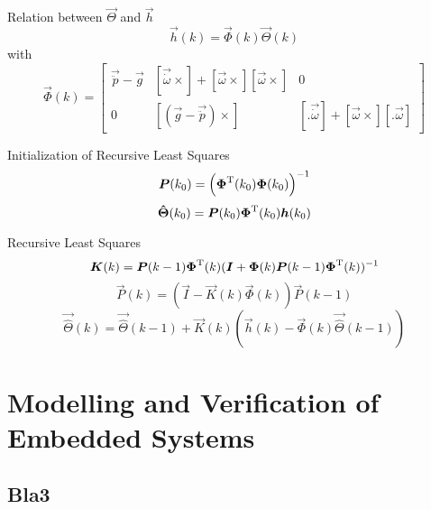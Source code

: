 Relation between $\vec{\Theta}$ and $\vec{h}$
\begin{equation}
	\vec{h}(k) = \vec{\Phi}(k) \vec{\Theta}(k)
\end{equation}
with
\begin{equation}
	\vec{\Phi}(k) = 
	\begin{bmatrix}
		\vec{\ddot p} - \vec{g}	& [\vec{\dot \omega} \times] + [\vec{\omega}\times] [\vec{\omega} \times]	& 0 \\
		0			& [(\vec{g} - \vec{\ddot p}) \times]									& [.  \vec{\dot \omega}] + [\vec{\omega} \times] [. \vec{\omega}]
	\end{bmatrix}
\end{equation}

Initialization of Recursive Least Squares
\begin{equation}
	\boldsymbol{P}(k_0) = \left( \boldsymbol{\Phi}^{\mathrm{T}}(k_0) \boldsymbol{\Phi}(k_0) \right)^{-1}
\end{equation}
\begin{equation}
	\boldsymbol{\hat \Theta} (k_0) = \boldsymbol{P}(k_0) \boldsymbol{\Phi}^{\mathrm{T}}(k_0) \boldsymbol{h}(k_0)
\end{equation}

Recursive Least Squares
\begin{equation}
	\boldsymbol{K}(k) = \boldsymbol{P}(k-1) \boldsymbol{\Phi}^{\mathrm{T}}(k) (\boldsymbol{I} + \boldsymbol{\Phi}(k) \boldsymbol{P}(k - 1) \boldsymbol{\Phi}^{\mathrm{T}}(k))^{-1}
\end{equation}
\begin{equation}
	\vec{P}(k) = (\vec{I} - \vec{K}(k) \vec{\Phi}(k)) \vec{P}(k - 1)
\end{equation}
\begin{equation}
	\vec{\hat \Theta}(k)=\vec{ \hat \Theta}(k - 1) + \vec{K}(k) (\vec{h}(k) - \vec{\Phi}(k) \vec{\hat \Theta}(k - 1))
\end{equation}

\chapter{Modelling and Verification of Embedded Systems}

\section{Bla3}
\label{sec:bla3}
\lipsum[1] 
